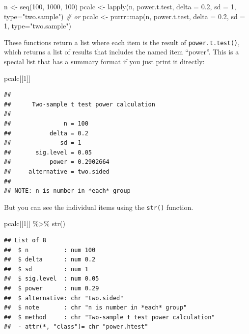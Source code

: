 \documentclass[
  oneside]{book}
\newenvironment{Shaded}{\begin{snugshade}}{\end{snugshade}}
\newcommand{\AttributeTok}[1]{\textcolor[rgb]{0.77,0.63,0.00}{#1}}
\newcommand{\CommentTok}[1]{\textcolor[rgb]{0.56,0.35,0.01}{\textit{#1}}}
\newcommand{\DecValTok}[1]{\textcolor[rgb]{0.00,0.00,0.81}{#1}}
\newcommand{\FloatTok}[1]{\textcolor[rgb]{0.00,0.00,0.81}{#1}}
\newcommand{\FunctionTok}[1]{\textcolor[rgb]{0.00,0.00,0.00}{#1}}
\newcommand{\NormalTok}[1]{#1}
\newcommand{\OtherTok}[1]{\textcolor[rgb]{0.56,0.35,0.01}{#1}}
\newcommand{\SpecialCharTok}[1]{\textcolor[rgb]{0.00,0.00,0.00}{#1}}
\newcommand{\StringTok}[1]{\textcolor[rgb]{0.31,0.60,0.02}{#1}}
\begin{document}
\begin{Shaded}
\begin{Highlighting}[]
\NormalTok{n }\OtherTok{\textless{}{-}} \FunctionTok{seq}\NormalTok{(}\DecValTok{100}\NormalTok{, }\DecValTok{1000}\NormalTok{, }\DecValTok{100}\NormalTok{)}
\NormalTok{pcalc }\OtherTok{\textless{}{-}} \FunctionTok{lapply}\NormalTok{(n, power.t.test, }
                \AttributeTok{delta =} \FloatTok{0.2}\NormalTok{, }\AttributeTok{sd =} \DecValTok{1}\NormalTok{, }\AttributeTok{type=}\StringTok{"two.sample"}\NormalTok{)}
\CommentTok{\# or}
\NormalTok{pcalc }\OtherTok{\textless{}{-}}\NormalTok{ purrr}\SpecialCharTok{::}\FunctionTok{map}\NormalTok{(n, power.t.test, }
                \AttributeTok{delta =} \FloatTok{0.2}\NormalTok{, }\AttributeTok{sd =} \DecValTok{1}\NormalTok{, }\AttributeTok{type=}\StringTok{"two.sample"}\NormalTok{)}
\end{Highlighting}
\end{Shaded}

These functions return a list where each item is the result of \texttt{power.t.test()}, which returns a list of results that includes the named item ``power''. This is a special list that has a summary format if you just print it directly:

\begin{Shaded}
\begin{Highlighting}[]
\NormalTok{pcalc[[}\DecValTok{1}\NormalTok{]]}
\end{Highlighting}
\end{Shaded}

\begin{verbatim}
## 
##      Two-sample t test power calculation 
## 
##               n = 100
##           delta = 0.2
##              sd = 1
##       sig.level = 0.05
##           power = 0.2902664
##     alternative = two.sided
## 
## NOTE: n is number in *each* group
\end{verbatim}

But you can see the individual items using the \texttt{str()} function.

\begin{Shaded}
\begin{Highlighting}[]
\NormalTok{pcalc[[}\DecValTok{1}\NormalTok{]] }\SpecialCharTok{\%\textgreater{}\%} \FunctionTok{str}\NormalTok{()}
\end{Highlighting}
\end{Shaded}

\begin{verbatim}
## List of 8
##  $ n          : num 100
##  $ delta      : num 0.2
##  $ sd         : num 1
##  $ sig.level  : num 0.05
##  $ power      : num 0.29
##  $ alternative: chr "two.sided"
##  $ note       : chr "n is number in *each* group"
##  $ method     : chr "Two-sample t test power calculation"
##  - attr(*, "class")= chr "power.htest"
\end{verbatim}
\end{document}
